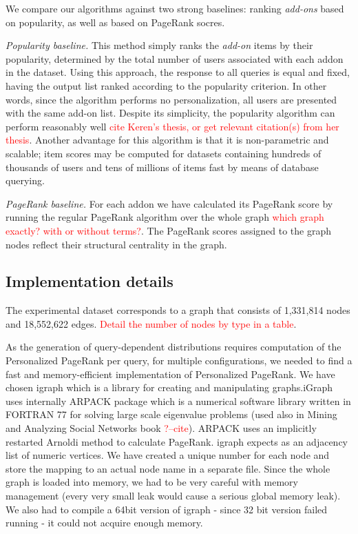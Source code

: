 \documentclass[11pt,oneside]{book}
\let\Oldsubsection\subsection
\renewcommand{\subsection}{\FloatBarrier\Oldsubsection}
\begin{document}
We compare our algorithms against two strong baselines: ranking {\it add-ons} based on popularity, as well as 
based on PageRank socres. 

{\it Popularity baseline.} This method simply ranks the {\it add-on} items by their popularity, determined by the total number of users associated with each addon in the dataset. Using this approach, the response to all queries is equal and fixed, having the output list ranked according to the popularity criterion. 
In other words, since the algorithm performs no personalization, all users are presented with the same
add-on  list. Despite its simplicity, the popularity algorithm can perform reasonably well \textcolor{red}{cite Keren's thesis, or get relevant citation(s) from her thesis}. Another advantage for this algorithm is that it is non-parametric and scalable; item scores may be computed for datasets containing hundreds of thousands of users and tens of millions of items fast by means of database querying. 

{\it PageRank baseline.} For each addon we have calculated
its PageRank score by running the regular PageRank algorithm over the
whole graph \textcolor{red}{which graph exactly? with or without terms?}. The PageRank scores assigned to the graph nodes 
reflect their structural centrality in the graph. 

\subsection{Implementation details}

The experimental dataset corresponds to a graph that consists of 1,331,814 nodes and 18,552,622
edges. \textcolor{red}{Detail the number of nodes by type in a table}. 

As the generation of query-dependent distributions requires computation of the Personalized PageRank per query, for multiple configurations, we needed to find a fast and memory-efficient implementation
of Personalized PageRank. We have chosen igraph \citep{igraph} which is a library for creating
and manipulating graphs.iGraph uses internally ARPACK package which is
a numerical software library written in FORTRAN 77 for solving large
scale eigenvalue problems (used also in Mining and Analyzing Social
Networks book \textcolor{red}{?--cite}). ARPACK uses an implicitly restarted Arnoldi method to
calculate PageRank. igraph expects as an adjacency list of numeric
vertices. We have created a unique number for each node and store the
mapping to an actual node name in a separate file. Since the whole
graph is loaded into memory, we had to be very careful with memory
management (every very small leak would cause a serious global memory
leak). We also had to compile a 64bit version of igraph - since 32 bit
version failed running - it could not acquire enough memory.
\end{document}

